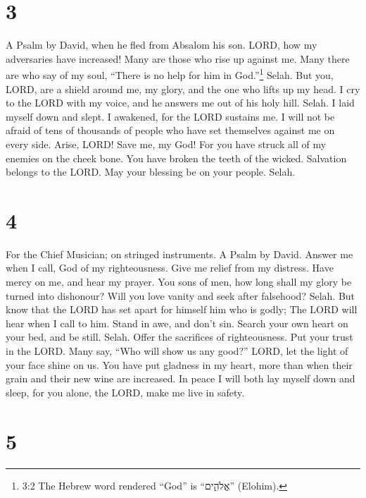 \hypertarget{section-2}{%
\section{3}\label{section-2}}

A Psalm by David, when he fled from Absalom his son.  LORD,
how my adversaries have increased! Many are those who rise up against
me.  Many there are who say of my soul, ``There is no help
for him in God.''\footnote{3:2 The Hebrew word rendered ``God'' is
  ``אֱלֹהִ֑ים'' (Elohim).} Selah.  But you, LORD, are a
shield around me, my glory, and the one who lifts up my head.
 I cry to the LORD with my voice, and he answers me out of
his holy hill. Selah.  I laid myself down and slept. I
awakened, for the LORD sustains me.  I will not be afraid of
tens of thousands of people who have set themselves against me on every
side.  Arise, LORD! Save me, my God! For you have struck all
of my enemies on the cheek bone. You have broken the teeth of the
wicked.  Salvation belongs to the LORD. May your blessing be
on your people. Selah.

\hypertarget{section-3}{%
\section{4}\label{section-3}}

For the Chief Musician; on stringed instruments. A Psalm by David.
 Answer me when I call, God of my righteousness. Give me
relief from my distress. Have mercy on me, and hear my prayer.
 You sons of men, how long shall my glory be turned into
dishonour? Will you love vanity and seek after falsehood? Selah.
 But know that the LORD has set apart for himself him who is
godly; The LORD will hear when I call to him.  Stand in awe,
and don't sin. Search your own heart on your bed, and be still. Selah.
 Offer the sacrifices of righteousness. Put your trust in
the LORD.  Many say, ``Who will show us any good?'' LORD,
let the light of your face shine on us.  You have put
gladness in my heart, more than when their grain and their new wine are
increased.  In peace I will both lay myself down and sleep,
for you alone, the LORD, make me live in safety.

\hypertarget{section-4}{%
\section{5}\label{section-4}}

